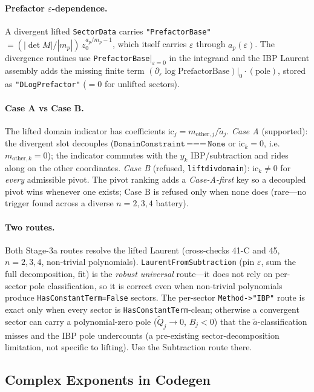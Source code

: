 \documentclass[11pt,a4paper]{article}
\begin{document}
\paragraph{Prefactor $\varepsilon$-dependence.} A divergent lifted \texttt{SectorData} carries \texttt{"PrefactorBase"} $=(|\det M|/|m_p|)\,z_0^{a_p/m_p-1}$, which itself carries $\varepsilon$ through $a_p(\varepsilon)$. The divergence routines use \texttt{PrefactorBase}$|_{\varepsilon=0}$ in the integrand and the IBP Laurent assembly adds the missing finite term $(\partial_\varepsilon\log\text{PrefactorBase})|_0\cdot(\text{pole})$, stored as \texttt{"DLogPrefactor"} ($=0$ for unlifted sectors).

\paragraph{Case A vs Case B.} The lifted domain indicator has coefficients $\mathrm{ic}_j=m_{\text{other},j}/\tilde a_j$. \emph{Case A} (supported): the divergent slot decouples ($\texttt{DomainConstraint}\,\texttt{===}\,\texttt{None}$ or $\mathrm{ic}_k=0$, i.e.\ $m_{\text{other},k}=0$); the indicator commutes with the $y_k$ IBP/subtraction and rides along on the other coordinates. \emph{Case B} (refused, \texttt{liftdivdomain}): $\mathrm{ic}_k\neq 0$ for \emph{every} admissible pivot. The pivot ranking adds a \emph{Case-A-first} key so a decoupled pivot wins whenever one exists; Case B is refused only when none does (rare---no trigger found across a diverse $n=2,3,4$ battery).

\paragraph{Two routes.} Both Stage-3a routes resolve the lifted Laurent (cross-checks 41-C and 45, $n=2,3,4$, non-trivial polynomials). \texttt{LaurentFromSubtraction} (pin $\varepsilon$, sum the full decomposition, fit) is the \emph{robust universal} route---it does not rely on per-sector pole classification, so it is correct even when non-trivial polynomials produce \texttt{HasConstantTerm=False} sectors. The per-sector \texttt{Method->"IBP"} route is exact only when every sector is \texttt{HasConstantTerm}-clean; otherwise a convergent sector can carry a polynomial-zero pole ($\tilde Q_j\to 0$, $B_j<0$) that the $\tilde a$-classification misses and the IBP pole undercounts (a pre-existing sector-decomposition limitation, not specific to lifting). Use the Subtraction route there.

\subsection{Complex Exponents in Codegen}\label{sec:complexcodegen}
\end{document}
